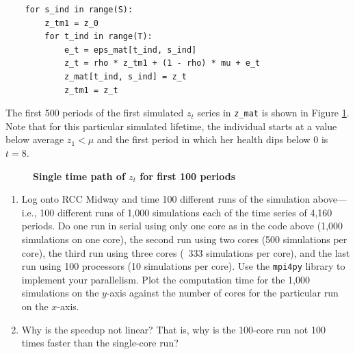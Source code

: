 \documentclass[letterpaper,12pt]{article}
\theoremstyle{definition}
\begin{document}
\begin{enumerate}
\begin{lstlisting}
    for s_ind in range(S):
        z_tm1 = z_0
        for t_ind in range(T):
            e_t = eps_mat[t_ind, s_ind]
            z_t = rho * z_tm1 + (1 - rho) * mu + e_t
            z_mat[t_ind, s_ind] = z_t
            z_tm1 = z_t
  \end{lstlisting}
  \vspace{3mm}
  The first 500 periods of the first simulated $z_t$ series in \texttt{z\_mat} is shown in Figure \ref{FigZtPath}. Note that for this particular simulated lifetime, the individual starts at a value below average $z_1<\mu$ and the first period in which her health dips below 0 is $t=8$.

  \begin{figure}[htb]\centering \captionsetup{width=4.5in}
    \caption{\label{FigZtPath}\textbf{Single time path of $z_t$ for first 100 periods}}
  \end{figure}

  \begin{enumerate}
    \item Log onto RCC Midway and time 100 different runs of the simulation above---i.e., 100 different runs of 1,000 simulations each of the time series of 4,160 periods. Do one run in serial using only one core as in the code above (1,000 simulations on one core), the second run using two cores (500 simulations per core), the third run using three cores (~333 simulations per core), and the last run using 100 processors (10 simulations per core). Use the \texttt{mpi4py} library to implement your parallelism. Plot the computation time for the 1,000 simulations on the $y$-axis against the number of cores for the particular run on the $x$-axis.
    \item Why is the speedup not linear? That is, why is the 100-core run not 100 times faster than the single-core run?
  \end{enumerate}


\end{enumerate}
\end{document}
